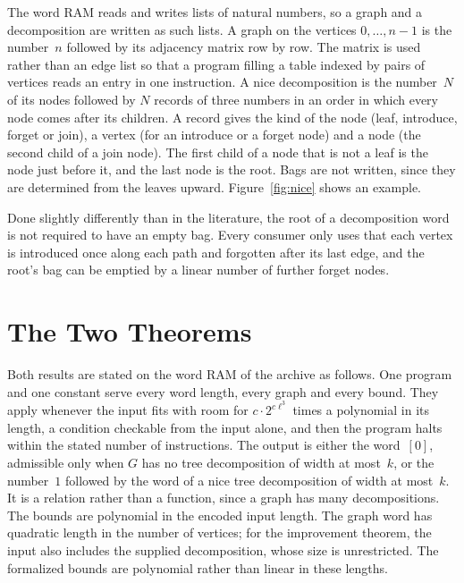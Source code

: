 \documentclass[11pt,a4paper]{article}
\theoremstyle{definition}
\begin{document}
The word RAM reads and writes lists of natural numbers, so a graph and a decomposition are
written as such lists. A graph on the vertices $0,\dots,n-1$ is the number~$n$ followed by its
adjacency matrix row by row. The matrix is used rather than an edge list so that a program filling
a table indexed by pairs of vertices reads an entry in one instruction. A nice decomposition is the
number~$N$ of its nodes followed by $N$ records of three numbers in an order in which every node
comes after its children. A record gives the kind of the node (leaf, introduce, forget or join), a
vertex (for an introduce or a forget node) and a node (the second child of a join node). The first
child of a node that is not a leaf is the node just before it, and the last node is the root. Bags
are not written, since they are determined from the leaves upward. Figure~\ref{fig:nice} shows an
example.

Done slightly differently than in the literature, the root of a decomposition word is not required
to have an empty bag. Every consumer only uses that each vertex is introduced once along each path
and forgotten after its last edge, and the root's bag can be emptied by a linear number of further
forget nodes.



\section{The Two Theorems}

Both results are stated on the word RAM of the archive as follows. One program and one constant
serve every word length, every graph and every bound. They apply whenever the input fits with
room for $c\cdot 2^{c\ell^3}$ times a polynomial in its length, a condition checkable from the
input alone, and then the program halts within the stated number of instructions. The output is
either the word~$[0]$, admissible only when $G$ has no tree decomposition of width at most~$k$, or
the number~$1$ followed by the word of a nice tree decomposition of width at most~$k$. It is a
relation rather than a function, since a graph has many decompositions. The bounds are polynomial
in the encoded input length. The graph word has quadratic length in the number of vertices;
for the improvement theorem, the input also includes the supplied decomposition, whose size
is unrestricted. The formalized bounds are polynomial rather than linear in these lengths.
\end{document}
